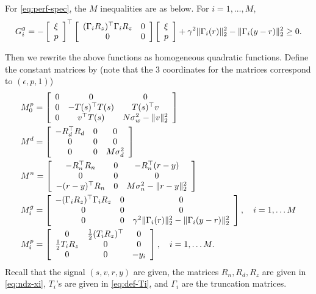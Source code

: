 \documentclass[11pt, onecolumn]{article}
\theoremstyle{plain}
\theoremstyle{plain}
\theoremstyle{definition}
\begin{document}
For \eqref{eq:perf-spec}, the $M$ inequalities are as below. For $i=1,\dots, M$,
\begin{align*}
  G^g_i= -   \left[ \begin{array}[c]{c} \xi\\ p \end{array} \right]^\top
    \left[ \begin{array}[c]{cc} (\Gamma_{i}R_z)^\top \Gamma_{i}R_z  &0 \\ 0 & 0  \end{array} \right]
  \left[ \begin{array}[c]{c} \xi\\ p \end{array} \right]
  + \gamma^2 \|\Gamma_{i}(r)\|_2^2 -   \|\Gamma_{i}(y-r)\|_2^2 \ge 0.
\end{align*}

Then we rewrite the above functions as homogeneous quadratic functions. Define the constant matrices
by (note that the 3 coordinates for the matrices correspond to $(\epsilon, p, 1)$)
\begin{align*}
  & M^p_0 = \left[ \begin{array}[c]{ccc} 0 &0&0 \\ 0 & -T(s)^\top T(s)& T(s)^\top v \\ 0& v^\top T(s)
    & N\sigma_w^2 - \|v\|_2^2 \end{array} \right]
  \\
  & M^d = \left[ \begin{array}[c]{ccc} -R_d^\top R_d &0 & 0 \\ 0 & 0 & 0 \\ 0&0&
    M\sigma_d^2 \end{array} \right]
  \\
  & M^n = \left[ \begin{array}[c]{ccc} -R_n^\top R_n &0& -R_n^\top(r-y) \\ 0 & 0& 0 \\ -(r-y)^\top
    R_n& 0 & M\sigma_n^2 - \|r-y\|_2^2 \end{array} \right]
  \\
  & M^g_i = \left[ \begin{array}[c]{ccc} - (\Gamma_{i}R_z)^\top \Gamma_{i}R_z &0 & 0 \\ 0 & 0 & 0 \\
    0&0& \gamma^2 \|\Gamma_{i}(r)\|_2^2 - \|\Gamma_{i}(y-r)\|_2^2 \end{array} \right], \quad i = 1,\dots M
  \\
  & M^p_i = \left[ \begin{array}[c]{ccc} 0 &{1\over 2}(T_iR_z)^\top & 0 \\ {1\over 2} T_iR_z & 0 & 0
    \\ 0&0& -y_i \end{array} \right], \quad i = 1,\dots M.
\end{align*}
Recall that the signal $(s,v, r, y)$ are given, the matrices $R_n, R_d,R_z$ are given in
\eqref{eq:ndz-xi}, $T_i$'s are given in \eqref{eq:def-Ti}, and $\Gamma_i$ are the truncation
matrices.
\end{document}
